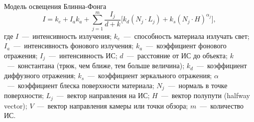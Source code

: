 \documentclass{beamer}
\begin{document}
	\begin{frame}{Модель освещения Блинна-Фонга}
		\[
			I = k_e + I_a k_a + \sum_{j=1}^{m} \frac{I_{j}}{d+k} \bigg[ k_d (N_j \cdot L_j) + k_s (N_j \cdot H)^{\alpha_j} \bigg]
		,
		\]
		где
		$I$~---~интенсивность излучения;
		$k_e$~---~способность материала излучать свет;
		$I_a$~---~интенсивность фонового излучения;
		$k_a$~---~коэффициент фонового отражения;
		$I_j$~---~интенсивность ИС;
		$d$~---~расстояние от ИС до объекта;
		$k$~---~константана (трюк, чем ближе, тем больше величина);
		$k_d$~---~коэффициент диффузного отражения;
		$k_s$~---~коэффициент зеркального отражения;
		$\alpha$~---~коэффициент блеска поверхности материала;
		$N_j$~---~нормаль в точке поверхности;
		$L_j$~---~вектор направления на ИС;
		$H$~---~вектор полупути (halfway vector);
		$V$~---~вектор направления камеры или точки обзора;
		$m$~---~количество ИС.


	\end{frame}

\end{document}
